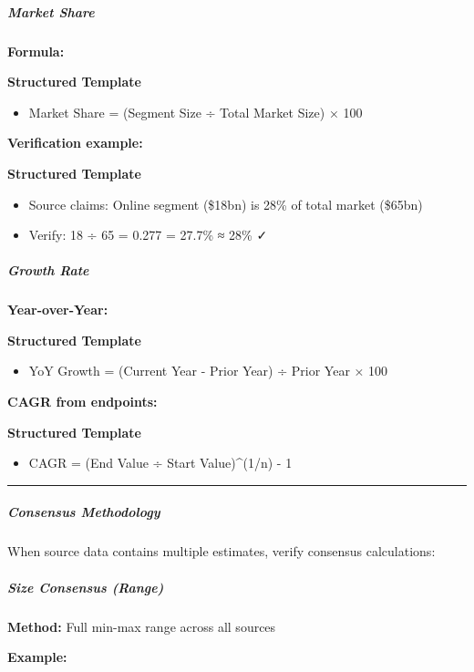 \documentclass[11pt]{article}
\begin{document}
\subparagraph{Market Share}\mbox{}\par

\textbf{Formula:}

\textbf{Structured Template}
\begin{itemize}[leftmargin=*,itemsep=2pt,topsep=2pt]
\item {} Market Share = (Segment Size ÷ Total Market Size) × 100
\end{itemize}

\textbf{Verification example:}

\textbf{Structured Template}
\begin{itemize}[leftmargin=*,itemsep=2pt,topsep=2pt]
\item {} Source claims: Online segment (\$18bn) is 28\% of total market (\$65bn)
\item {} Verify: 18 ÷ 65 = 0.277 = 27.7\% ≈ 28\% ✓
\end{itemize}

\subparagraph{Growth Rate}\mbox{}\par

\textbf{Year-over-Year:}

\textbf{Structured Template}
\begin{itemize}[leftmargin=*,itemsep=2pt,topsep=2pt]
\item {} YoY Growth = (Current Year - Prior Year) ÷ Prior Year × 100
\end{itemize}

\textbf{CAGR from endpoints:}

\textbf{Structured Template}
\begin{itemize}[leftmargin=*,itemsep=2pt,topsep=2pt]
\item {} CAGR = (End Value ÷ Start Value)\textasciicircum{}(1/n) - 1
\end{itemize}

\vspace{0.5em}\hrule\vspace{0.5em}

\subparagraph{Consensus Methodology}\mbox{}\par

When source data contains multiple estimates, verify consensus calculations:


\subparagraph{Size Consensus (Range)}\mbox{}\par

\textbf{Method:} Full min-max range across all sources


\textbf{Example:}
\end{document}
